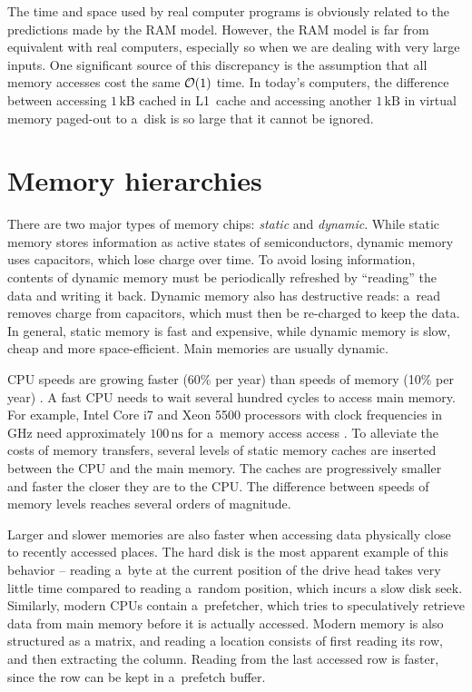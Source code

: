 The time and space used by real computer programs is obviously related
to the predictions made by the RAM model. However, the RAM model is far
from equivalent with real computers, especially so when we are dealing with
very large inputs. One significant source of this discrepancy is the assumption
that all memory accesses cost the same $\mathcal{O}(1)$ time. In today's computers,
the difference between accessing $1\,\text{kB}$ cached in L1~cache and
accessing another $1\,\text{kB}$ in virtual memory paged-out to a~disk is so
large that it cannot be ignored.

\section{Memory hierarchies}
There are two major types of memory chips: \emph{static} and \emph{dynamic}.
While static memory stores information as active states of semiconductors,
dynamic memory uses capacitors, which lose charge over time. To avoid losing
information, contents of dynamic memory must be periodically refreshed by
``reading'' the data and writing it back. Dynamic memory also has destructive
reads: a~read removes charge from capacitors, which must then be re-charged
to keep the data. In general, static memory is fast and expensive, while dynamic
memory is slow, cheap and more space-efficient. Main memories are usually
dynamic.

CPU speeds are growing faster (60\% per year) than speeds of memory (10\% per
year) \cite{Ailamaki:2004:DAN:1316689.1316801}.
A fast CPU needs to wait several hundred cycles to access main memory.
For example, Intel Core i7 and Xeon 5500 processors with clock frequencies
in GHz need approximately $100\,\text{ns}$ for a~memory access
access \cite{perf-analysis-guide}.
To alleviate the costs of memory transfers, several levels of static memory
caches are inserted between the CPU and the main memory. The caches are
progressively smaller and faster the closer they are to the CPU. The difference
between speeds of memory levels reaches several orders of magnitude.

Larger and slower memories are also faster when accessing data physically
close to recently accessed places. The hard disk is the most apparent example
of this behavior -- reading a~byte at the current position of the drive
head takes very little time compared to reading a~random position, which incurs
a slow disk seek. %
Similarly, modern CPUs contain a~prefetcher, which tries to speculatively
retrieve data from main memory before it is actually accessed.
Modern memory is also structured as a matrix, and reading a location consists
of first reading its row, and then extracting the column. Reading from the last
accessed row is faster, since the row can be kept in a~prefetch buffer.

